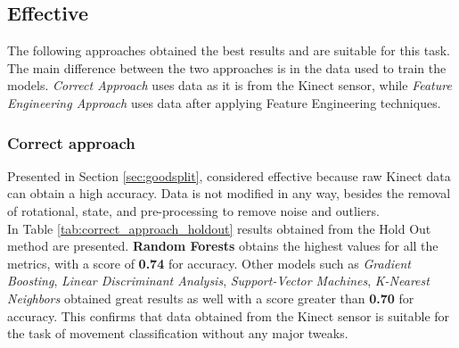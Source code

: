         \subsection{Effective}

                The following approaches obtained the best results and are suitable for this task. The main difference between the two approaches is in the data used to train the models. \textit{Correct Approach} uses data as it is from the Kinect sensor, while \textit{Feature Engineering Approach} uses data after applying Feature Engineering techniques.
                
            \subsubsection{Correct approach}

                Presented in Section \ref{sec:goodsplit}, considered effective because raw Kinect data can obtain a high accuracy. Data is not modified in any way, besides the removal of rotational, state, and pre-processing to remove noise and outliers.\\
                 
                In Table \ref{tab:correct_approach_holdout} results obtained from the Hold Out method are presented. \textbf{Random Forests} obtains the highest values for all the metrics, with a score of \textbf{0.74} for accuracy. Other models such as \textit{Gradient Boosting}, \textit{Linear Discriminant Analysis}, \textit{Support-Vector Machines}, \textit{K-Nearest Neighbors} obtained great results as well with a score greater than \textbf{0.70} for accuracy. This confirms that data obtained from the Kinect sensor is suitable for the task of movement classification without any major tweaks.\\
                
                \newpage

